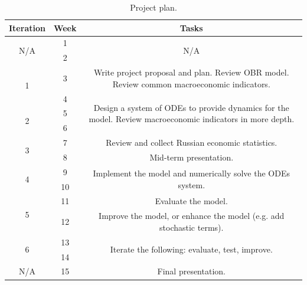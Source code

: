 \begin{table}[!htb]
\centering
\begin{tabular}{|c|c|c|}
\hline
Iteration            & Week & Tasks                                                                \\ \hline
\multirow{2}{*}{N/A} & 1    & \multirow{2}{*}{N/A}                                                 \\ \cline{2-2}
                     & 2    &                                                                      \\ \hline
\multirow{2}{*}{1} & 3  & Write project proposal and plan. Review OBR model. Review common macroeconomic indicators.                                 \\ \cline{2-3} 
                   & 4  & \multirow{3}{*}{Design a system of ODEs to provide dynamics for the model. Review macroeconomic indicators in more depth.} \\ \cline{1-2}
\multirow{2}{*}{2}   & 5    &                                                                      \\ \cline{2-2}
                     & 6    &                                                                      \\ \hline
\multirow{2}{*}{3}   & 7    & Review and collect Russian economic statistics.                      \\ \cline{2-3} 
                     & 8    & Mid-term presentation.                                               \\ \hline
\multirow{2}{*}{4} & 9  & \multirow{2}{*}{Implement the model and numerically solve the ODEs system.}                                                \\ \cline{2-2}
                     & 10   &                                                                      \\ \hline
\multirow{2}{*}{5}   & 11   & Evaluate the model.                                                  \\ \cline{2-3} 
                     & 12   & Improve the model, or enhance the model (e.g. add stochastic terms). \\ \hline
\multirow{2}{*}{6} & 13 & \multirow{2}{*}{Iterate the following: evaluate, test, improve.}                                                           \\ \cline{2-2}
                     & 14   &                                                                      \\ \hline
N/A                  & 15   & Final presentation.                                                  \\ \hline
\end{tabular}
\caption{Project plan.}
\label{tbl:plan}
\end{table}



